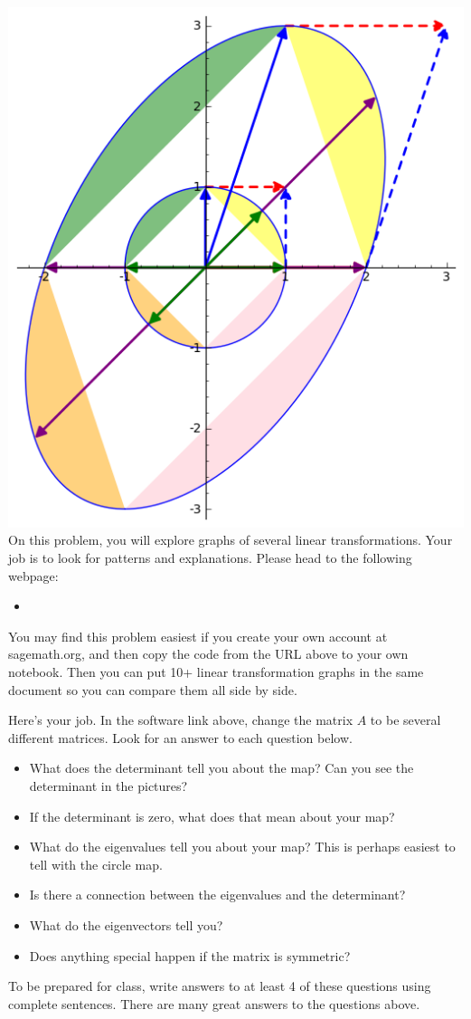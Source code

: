 \begin{problem}
{\includegraphics[width=\marginparwidth]{lineartransformation2.png}
}%
 On this problem, you will explore graphs of several linear transformations. Your job is to look for patterns and explanations.  Please head to the following webpage:
\begin{itemize}
 \item \href{\urllineartransformationsinplane}{\urllineartransformationsinplane}
\end{itemize}
You may find this problem easiest if you create your own account at sagemath.org, and then copy the code from the URL above to your own notebook. Then you can put 10+ linear transformation graphs in the same document so you can compare them all side by side. 

Here's your job. In the software link above, change the matrix $A$ to be several different matrices. Look for an answer to each question below.
\begin{itemize}
 \item What does the determinant tell you about the map? Can you see the determinant in the pictures?
 \item If the determinant is zero, what does that mean about your map?
 \item What do the eigenvalues tell you about your map? This is perhaps easiest to tell with the circle map.
 \item Is there a connection between the eigenvalues and the determinant?
 \item What do the eigenvectors tell you?
 \item Does anything special happen if the matrix is symmetric?
\end{itemize}
To be prepared for class, write answers to at least 4 of these questions using complete sentences.
There are many great answers to the questions above. 


\end{problem}
